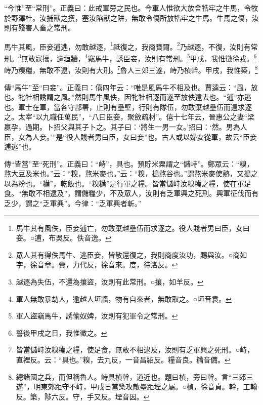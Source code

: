 {\noindent\shu{}\fzkt “今惟”至“常刑”。正義曰：此戒軍旁之民也。今軍人惟欲大放舍牿牢之牛馬，令牧於野澤杜。汝捕獸之擭，塞汝陷獸之阱，無敢令傷所放牿牢之牛馬。牛馬之傷，汝則有殘害人畜之常刑。 \par}

馬牛其風，臣妾逋逃，勿敢越逐，\footnote{馬牛其有風佚，臣妾逋亡，勿敢棄越壘伍而求逐之。役人賤者男曰臣，女曰妾。○逋，布吳反。佚音逸。}祗復之，我商賚爾。\footnote{眾人其有得佚馬牛、逃臣妾，皆敬還復之，我則商度汝功，賜與汝。○商如字，徐音章。賚，力代反，徐音來。度，待洛反。}乃越逐，不復，汝則有常刑。\footnote{越逐為失伍，不還為攘盜，汝則有此常刑。○攘，如羊反。}無敢寇攘，逾垣牆，\footnote{軍人無敢暴劫人，逾越人垣牆，物有自來者，無敢取之。○垣音袁。}竊馬牛，誘臣妾，汝則有常刑。\footnote{軍人盜竊馬牛，誘偷奴婢，汝則有犯軍令之常刑。}甲戌，我惟徵徐戎。\footnote{誓後甲戌之日，我惟徵之。}峙乃糗糧，無敢不逮，汝則有大刑。\footnote{皆當儲峙汝糗糒之糧，使足食，無敢不相逮及，汝則有乏軍興之死刑。○峙，直裡反。云：“具也。”糗，去九反，一音昌紹反。糧音良。糒音備。}魯人三郊三遂，峙乃楨幹。甲戌，我惟築，\footnote{總諸國之兵，而但稱魯人。峙具楨幹，道近也。題曰楨，旁曰幹。言“三郊三遂”，明東郊距守不峙，甲戌日當築攻敵壘距堙之屬。○楨，徐音貞。幹，工翰反。築，陟六反。守，手又反。堙音因。}


{\noindent\zhuan{}\fzbyks 傳“馬牛”至“曰妾”。正義曰：僖四年云：“唯是風馬牛不相及也。賈逵云：“風，放也。牝牡相誘謂之風。”然則馬牛風佚，因牝牡相逐而遂至放佚遠去也。“逋”亦逃也。軍士在軍，當各守部署，止則有壘壁，行則有隊伍，勿敢棄越壘伍而遠求逐之。太宰“以九職任萬民”，“八曰臣妾，聚斂疏材”。僖十七年云，晉惠公之妻“梁嬴孕，過期。卜招父與其子卜之。其子曰：‘將生一男一女。’招曰：‘然。男為人臣，女為人妾。’”是“役人賤者男曰臣，女曰妾”也。古人或以婦女從軍，故云“臣妾逋逃”也。 \par}

{\noindent\zhuan{}\fzbyks 傳“皆當”至“死刑”。正義曰：“峙”，具也。預貯米粟謂之“儲峙”。鄭眾云：“糗，熬大豆及米也。”云：“糗，熬米麥也。”云：“糗，搗熬谷也。”謂熬米麥使熟，又搗之以為粉也。“糒”，乾飯也。“糗糒”是行軍之糧。皆當儲峙汝糗糒之糧，使在軍足食。“無敢不相逮及”，謂儲糧少，不及眾人，汝則有乏軍興之死刑。興軍征伐而有乏少，謂之“乏軍興”。今律：“乏軍興者斬。” \par}


